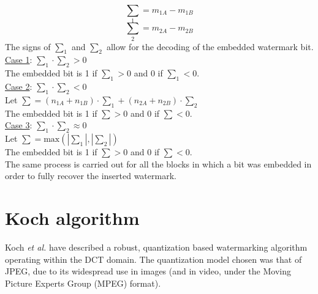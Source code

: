 \documentclass[12pt]{report}
\begin{document}
	\begin{equation}
		\mbox{$\sum_{1}$} = m_{1A} - m_{1B}
	\end{equation}
	\begin{equation}
		\mbox{$\sum_{2}$} = m_{2A} - m_{2B}
	\end{equation}
	The signs of $\sum_{1}$ and $\sum_{2}$ allow for the decoding of the embedded watermark bit. \\
	\underline{Case 1}: $\sum_{1} \cdot \sum_{2} > 0$ \\
	The embedded bit is 1 if $\sum_{1} > 0$ and 0 if $\sum_{1} < 0$. \\
	\underline{Case 2}: $\sum_{1} \cdot \sum_{2} < 0$ \\
	Let $\sum = (n_{1A}+n_{1B}) \cdot \sum_{1} + (n_{2A}+n_{2B}) \cdot \sum_{2}$ \\
	The embedded bit is 1 if $\sum > 0$ and 0 if $\sum < 0$. \\
	\underline{Case 3}: $\sum_{1} \cdot \sum_{2} \approx 0$ \\
	Let $\sum = \mbox{max} ( |\sum_{1}|, |\sum_{2}|)$ \\
	The embedded bit is 1 if $\sum > 0$ and 0 if $\sum < 0$. \\
	
	\noindent The same process is carried out for all the blocks in which a bit was embedded in order
	to fully recover the inserted watermark. 
	

	

\chapter{Koch algorithm}
\label{chapter:kochAlg}

	Koch \emph{et al.} \cite{BKX:koch1Pap,koch2} have described a robust, quantization based watermarking algorithm 
	operating within the DCT domain. The quantization model chosen was that of JPEG, 
	due to its widespread use in images (and in video, under the Moving Picture Experts Group (MPEG) format). 
\end{document}
